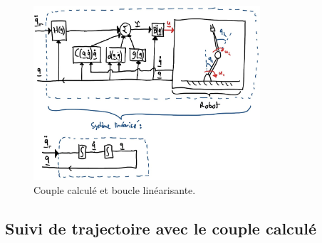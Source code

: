 \begin{figure}[htp]
	\centering
		\includegraphics[width=0.75\textwidth]{fig/computedtorque.jpg}
	\caption{Couple calculé et boucle linéarisante.}
	\label{fig:computedtorque}
\end{figure}

\subsection{Suivi de trajectoire avec le couple calculé}


